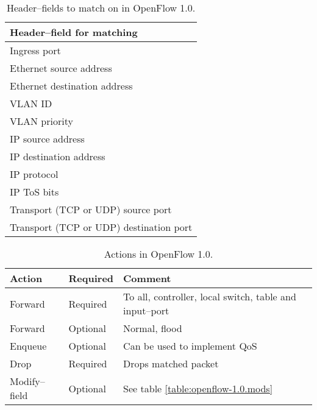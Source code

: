 \begin{table}
\begin{tabular}{|l|}
\hline \textbf{Header--field for matching} \\
\hline Ingress port \\
\hline Ethernet source address \\
\hline Ethernet destination address \\
\hline VLAN ID \\
\hline VLAN priority \\
\hline IP source address \\
\hline IP destination address \\
\hline IP protocol \\
\hline IP \ac{ToS} bits \\
\hline Transport (TCP or UDP) source port \\
\hline Transport (TCP or UDP) destination port \\
\hline
\end{tabular}
\caption{Header--fields to match on in OpenFlow 1.0.}
\label{table:openflow-1.0.headers}
\end{table}

\begin{table}
\begin{tabular}{|l|l|l|}
\hline \textbf{Action} &
       \textbf{Required} &
       \textbf{Comment} \\
\hline Forward & Required & To all, controller, local switch, table and input--port \\
\hline Forward & Optional & Normal, flood \\
\hline Enqueue & Optional &  Can be used to implement \ac{QoS} \\
\hline Drop    & Required &  Drops matched packet \\
\hline Modify--field & Optional &  See table \ref{table:openflow-1.0.mods} \\
\hline
\end{tabular}
\caption{Actions in OpenFlow 1.0.}
\label{table:openflow-1.0.actions}
\end{table}

